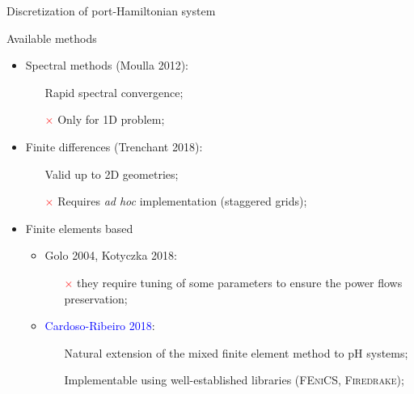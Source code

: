 \documentclass[aspectratio=169]{ISAE-Beamer}
\newcommand{\fenics}{\textsc{FEniCS}\xspace}
\newcommand{\firedrake}{\textsc{Firedrake}\xspace}
\begin{document}
\begin{frame}{Discretization of port-Hamiltonian system}
\begin{exampleblock}{Available methods}
	\begin{itemize}
		\item Spectral methods (Moulla 2012):
		\begin{itemize}
			\item[\textcolor{green}{\checkmark}] Rapid spectral convergence;
			\item[\textcolor{red}{$\times$}] Only for 1D problem;
		\end{itemize}
		\item Finite differences (Trenchant 2018):
		\begin{itemize}
			\item[\textcolor{green}{\checkmark}] Valid up to 2D geometries;
			\item[\textcolor{red}{$\times$}] Requires \textit{ad hoc} implementation (staggered grids);
		\end{itemize}
		\item Finite elements based
		\begin{itemize}
			\item Golo 2004, Kotyczka 2018: 
			\begin{itemize}
				\item[\textcolor{red}{$\times$}] they require tuning of some parameters to ensure the power flows preservation;
			\end{itemize}		
			\item \textcolor{blue}{Cardoso-Ribeiro 2018}:
			\begin{itemize}
				\item[\textcolor{green}{\checkmark}] Natural extension of the mixed finite element method to pH systems;
				\item[\textcolor{green}{\checkmark}] Implementable using well-established libraries (\fenics{}, \firedrake{});
			\end{itemize}
		\end{itemize}
	\end{itemize}
\end{exampleblock}
\end{frame}
\end{document}
